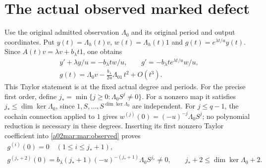 \documentclass[11pt,a4paper]{article}
\begin{document}
\section{The actual observed marked defect}
Use the original admitted observation $\Lambda_0$ and its original
period and output coordinates. Put
$y(t)=\Lambda_h(t)v$, $w(t)=\Lambda_h(t)1$ and
$g(t)=e^{\lambda t/u}y(t)$. Since
$A(t)v=\lambda v+b_\lambda t1$, one obtains
\begin{equation}\tag{MAR20}\label{a02mar:mar:observed}
 \begin{gathered}
 y'+\lambda y/u=-b_\lambda t w/u,\qquad
 g'=-b_\lambda t e^{\lambda t/u}w/u,\\
 g(t)=\Lambda_0v-\frac{b_\lambda}{2u}\Lambda_01\,t^2+O(t^3).
 \end{gathered}
\end{equation}
This Taylor statement is at the fixed actual degree and periods.
For the precise first order, define
$j_* =\min\{j\ge0:\Lambda_0 S^j\ne0\}$.
For a nonzero map it satisfies $j_*\le\dim\ker\Lambda_0$,
since $1,S,\ldots,S^{\dim\ker\Lambda_0}$ are independent.
For $j\le q-1$, the cochain connection applied to $1$ gives
$w^{(j)}(0)=(-u)^{-j}\Lambda_0S^j$; no polynomial reduction
is necessary in these degrees. Inserting its first nonzero
Taylor coefficient into \eqref{a02mar:mar:observed} proves
\begin{equation}\tag{MAR21}\label{a02mar:mar:firstdefect}
 \begin{gathered}
 g^{(i)}(0)=0\quad(1\le i\le j_*+1),\\
 g^{(j_*+2)}(0)
   =b_\lambda(j_*+1)(-u)^{-(j_*+1)}\Lambda_0S^{j_*}\ne0,
 \qquad j_*+2\le\dim\ker\Lambda_0+2.
 \end{gathered}
\end{equation}
\end{document}
